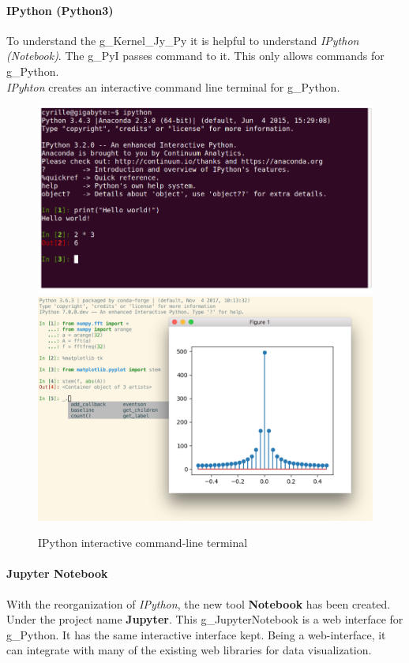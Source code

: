 \paragraph{IPython (Python3)}
To understand the \gls{g_Kernel_Jy_Py} it is helpful to understand \textit{IPython (Notebook)}. The \gls{g_PyI} passes command to it. This only allows commands for \gls{g_Python}.\\


\textit{IPyhton} creates an interactive command line terminal for \gls{g_Python}.  

\begin{figure}[H]
	\centering
	\includegraphics[scale = 0.3]{attachment/chapter_AML/Scc005}
	\includegraphics[scale = 0.2]{attachment/chapter_AML/Scc009}
	\caption{IPython interactive command-line terminal}
\end{figure}

\paragraph{Jupyter Notebook}
With the reorganization of \textit{IPython}, the new tool \textbf{Notebook} has been created. Under the project name \textbf{Jupyter}. This \gls{g_JupyterNotebook} is a web interface for \gls{g_Python}. It has the same interactive interface kept. Being a web-interface, it can integrate with many of the existing web libraries for data visualization.\\

